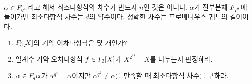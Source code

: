 \begin{pitfall}
$\alpha\in F_{q^n}$라고 해서 최소다항식의 차수가 반드시 $n$인 것은 아니다. $\alpha$가 진부분체 $F_{q^d}$에 들어가면 최소다항식 차수는 $d$의 약수이다. 정확한 차수는 프로베니우스 궤도의 길이이다.
\end{pitfall}

\begin{checkpoint}
\begin{enumerate}[label=(\alph*)]
  \item $F_3[X]$의 기약 이차다항식은 몇 개인가?
  \item 일계수 기약 오차다항식 $f\in F_2[X]$가 $X^{2^{10}}-X$를 나누는지 판정하라.
  \item $\alpha\in F_{q^{12}}$가 $\alpha^{q^4}=\alpha$이지만 $\alpha^{q^2}\ne\alpha$를 만족할 때 최소다항식 차수를 구하라.
\end{enumerate}
\end{checkpoint}
